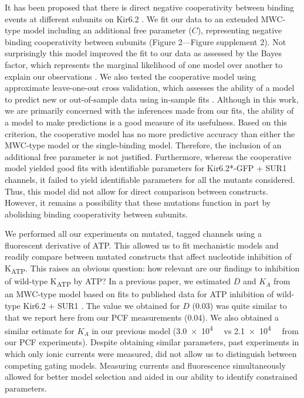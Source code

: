 \documentclass[10pt,lineno, doublespacing]{elife}
\begin{document}
It has been proposed that there is direct negative cooperativity between binding events at different subunits on Kir6.2 \citep{RN115}.
We fit our data to an extended MWC-type model including an additional free parameter ($C$), representing negative binding cooperativity between subunits (Figure 2—Figure supplement 2).
Not surprisingly this model improved the fit to our data as assessed by the Bayes factor, which represents the marginal likelihood of one model over another to explain our observations \citep{RN103, RN104}.
We also tested the cooperative model using approximate leave-one-out cross validation, which assesses the ability of a model to predict new or out-of-sample data using in-sample fits \citep{RN110}.
Although in this work, we are primarily concerned with the inferences made from our fits, the ability of a model to make predictions is a good measure of its usefulness.
Based on this criterion, the cooperative model has no more predictive accuracy than either the MWC-type model or the single-binding model.
Therefore, the inclusion of an additional free parameter is not justified.
Furthermore, whereas the cooperative model yielded good fits with identifiable parameters for Kir6.2*-GFP + SUR1 channels, it failed to yield identifiable parameters for all the mutants considered.
Thus, this model did not allow for direct comparison between constructs.
However, it remains a possibility that these mutations function in part by abolishing binding cooperativity between subunits.

We performed all our experiments on mutated, tagged channels using a fluorescent derivative of ATP.
This allowed us to fit mechanistic models and readily compare between mutated constructs that affect nucleotide inhibition of K\textsubscript{ATP}.
This raises an obvious question: how relevant are our findings to inhibition of wild-type K\textsubscript{ATP} by ATP?
In a previous paper, we estimated $D$ and $K_A$ from an MWC-type model based on fits to published data for ATP inhibition of wild-type Kir6.2 + SUR1 \citep{RN28, RN3}.
The value we obtained for $D$ (0.03) was quite similar to that we report here from our PCF measurements (0.04).
We also obtained a similar estimate for $K_A$ in our previous model (\SI{3.0e4}{\per\Molar} vs \SI{2.1e4}{\per\Molar} from our PCF experiments).
Despite obtaining similar parameters, past experiments in which only ionic currents were measured, did not allow us to distinguish between competing gating models.
Measuring currents and fluorescence simultaneously allowed for better model selection and aided in our ability to identify constrained parameters.
\end{document}
